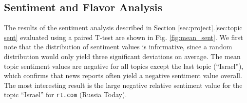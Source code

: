 \documentclass[final]{ieee}
\begin{document}







\subsection{Sentiment and Flavor Analysis}

The results of the sentiment analysis described in Section \ref{sec:project}.\ref{sec:topic sent} evaluated using a paired T-test are shown in Fig. \ref{fig:mean_sent}. We first note that the distribution of sentiment values is informative, since a random distribution would only yield three significant deviations on average. The mean topic sentiment values are negative for all topics except the last topic (``Israel''), which confirms that news reports often yield a negative sentiment value overall. The most interesting result is the large negative relative sentiment value for the topic ``Israel'' for \texttt{rt.com} (Russia Today).

\end{document}
